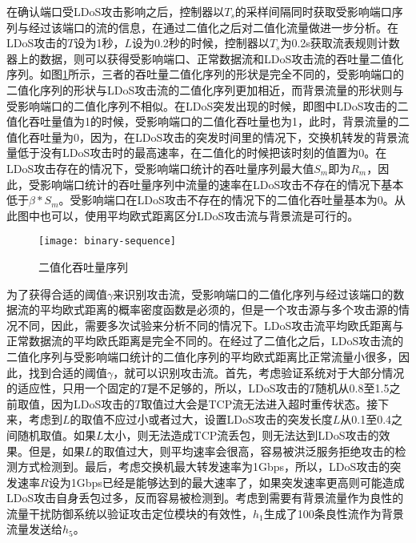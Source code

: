 在确认端口受LDoS攻击影响之后，控制器以$T_s$的采样间隔同时获取受影响端口序列与经过该端口的流的信息，在通过二值化之后对二值化流量做进一步分析。在LDoS攻击的$T$设为1秒，$L$设为0.2秒的时候，控制器以$T_s$为0.2s获取流表规则计数器上的数据，则可以获得受影响端口、正常数据流和LDoS攻击流的吞吐量二值化序列。如图\ref{fig:binary-sequence}所示，三者的吞吐量二值化序列的形状是完全不同的，受影响端口的二值化序列的形状与LDoS攻击流的二值化序列更加相近，而背景流量的形状则与受影响端口的二值化序列不相似。在LDoS突发出现的时候，即图中LDoS攻击的二值化吞吐量值为1的时候，受影响端口的二值化吞吐量也为1，此时，背景流量的二值化吞吐量为0，因为，在LDoS攻击的突发时间里的情况下，交换机转发的背景流量低于没有LDoS攻击时的最高速率，在二值化的时候把该时刻的值置为0。在LDoS攻击存在的情况下，受影响端口统计的吞吐量序列最大值$S_m$即为$R_m$，因此，受影响端口统计的吞吐量序列中流量的速率在LDoS攻击不存在的情况下基本低于$\beta * S_m$。受影响端口在LDoS攻击不存在的情况下的二值化吞吐量基本为0。从此图中也可以，使用平均欧式距离区分LDoS攻击流与背景流是可行的。



\begin{figure}
    \centering
    \texttt{[image: binary-sequence]}
    \caption{二值化吞吐量序列}
    \label{fig:binary-sequence}
\end{figure}



为了获得合适的阈值$\gamma$来识别攻击流，受影响端口的二值化序列与经过该端口的数据流的平均欧式距离的概率密度函数是必须的，但是一个攻击源与多个攻击源的情况不同，因此，需要多次试验来分析不同的情况下。LDoS攻击流平均欧氏距离与正常数据流的平均欧氏距离是完全不同的。在经过了二值化之后，LDoS攻击流的二值化序列与受影响端口统计的二值化序列的平均欧式距离比正常流量小很多，因此，找到合适的阈值$\gamma$，就可以识别攻击流。首先，考虑验证系统对于大部分情况的适应性，只用一个固定的$T$是不足够的，所以，LDoS攻击的$T$随机从0.8至1.5之前取值，因为LDoS攻击的$T$取值过大会是TCP流无法进入超时重传状态。接下来，考虑到$L$的取值不应过小或者过大，设置LDoS攻击的突发长度$L$从0.1至0.4之间随机取值。如果$L$太小，则无法造成TCP流丢包，则无法达到LDoS攻击的效果。但是，如果$L$的取值过大，则平均速率会很高，容易被洪泛服务拒绝攻击的检测方式检测到。最后，考虑交换机最大转发速率为1Gbps，所以，LDoS攻击的突发速率$R$设为1Gbps已经是能够达到的最大速率了，如果突发速率更高则可能造成LDoS攻击自身丢包过多，反而容易被检测到。考虑到需要有背景流量作为良性的流量干扰防御系统以验证攻击定位模块的有效性，$h_1$生成了100条良性流作为背景流量发送给$h_5$。

